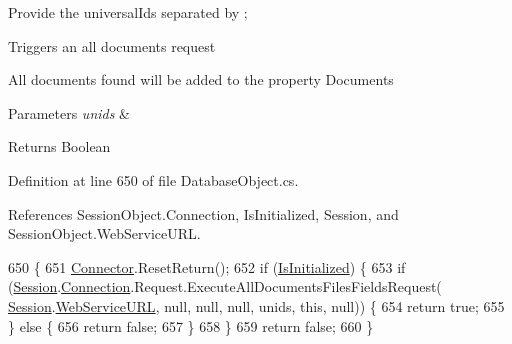 Provide the universal\+Ids separated by ;

Triggers an all documents request

All documents found will be added to the property \textquotesingle{}Documents\textquotesingle{}


\begin{DoxyParams}{Parameters}
{\em unids} & \\
\hline
\end{DoxyParams}
\begin{DoxyReturn}{Returns}
Boolean
\end{DoxyReturn}


Definition at line 650 of file Database\+Object.\+cs.



References Session\+Object.\+Connection, Is\+Initialized, Session, and Session\+Object.\+Web\+Service\+U\+RL.


\begin{DoxyCode}
650                                                                       \{
651         \mbox{\hyperlink{class_connector}{Connector}}.ResetReturn();
652         \textcolor{keywordflow}{if} (\mbox{\hyperlink{class_database_object_a5fe036d32a30eb10d1b3f6a30263f740}{IsInitialized}}) \{
653             \textcolor{keywordflow}{if} (\mbox{\hyperlink{class_database_object_aa8484162b7d2a7c4c9426bca13c64c07}{Session}}.\mbox{\hyperlink{class_session_object_a014bdbf705a753540e19bfb53030c55c}{Connection}}.Request.ExecuteAllDocumentsFilesFieldsRequest(
      \mbox{\hyperlink{class_database_object_aa8484162b7d2a7c4c9426bca13c64c07}{Session}}.\mbox{\hyperlink{class_session_object_a697c071c812fbf7ad1166b896fb44c16}{WebServiceURL}}, null, null, null, unids, \textcolor{keyword}{this}, null)) \{
654                 \textcolor{keywordflow}{return} \textcolor{keyword}{true};
655             \} \textcolor{keywordflow}{else} \{
656                 \textcolor{keywordflow}{return} \textcolor{keyword}{false};
657             \}
658         \}
659         \textcolor{keywordflow}{return} \textcolor{keyword}{false};
660     \}
\end{DoxyCode}
\mbox{\label{class_database_object_a0e6ff0557f91850aee2d5bf77ba7fc82}} 
